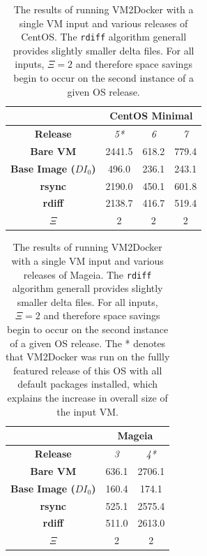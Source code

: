 \begin{table}[h]
\centering
    \begin{tabular}{| c | c | c | c |}
    \hline
& \multicolumn{3}{|c|}{\bfseries CentOS Minimal} \\ \hline
    \bfseries Release & \itshape 5* & \itshape 6 & \itshape 7 \\ \hline
    \bfseries Bare VM & 2441.5 &  618.2 & 779.4\\ \hline
    \bfseries Base Image ($DI_0$) & 496.0 & 236.1 & 243.1\\ \hline
    \bfseries rsync & 2190.0 & 450.1 & 601.8\\ \hline 
    \bfseries rdiff & 2138.7 & 416.7 & 519.4\\ \hline
\bfseries $\Xi$ & 2 & 2 & 2 \\ \hline
    \end{tabular}
\caption{The results of running VM2Docker with a single VM input and various releases of CentOS. The \texttt{rdiff} algorithm generall provides slightly smaller delta files. For all inputs, $\Xi = 2$ and therefore space savings begin to occur on the second instance of a given OS release.}
\label{table:diff2}
\end{table}

\begin{table}[h]
\centering
    \begin{tabular}{| c | c | c |}
    \hline
& \multicolumn{2}{|c|}{\bfseries Mageia} \\ \hline
    \bfseries Release & \itshape 3 & \itshape 4*  \\ \hline
    \bfseries Bare VM & 636.1 & 2706.1 \\ \hline
    \bfseries Base Image ($DI_0$) & 160.4 & 174.1\\ \hline
    \bfseries rsync & 525.1 & 2575.4\\ \hline 
    \bfseries rdiff & 511.0 & 2613.0\\ \hline 
\bfseries $\Xi$ & 2 & 2  \\ \hline
    \end{tabular}
\caption{The results of running VM2Docker with a single VM input and various releases of Mageia. The \texttt{rdiff} algorithm generall provides slightly smaller delta files. For all inputs, $\Xi = 2$ and therefore space savings begin to occur on the second instance of a given OS release. The * denotes that VM2Docker was run on the fullly featured release of this OS with all default packages installed, which explains the increase in overall size of the input VM.}
\label{table:diff3}
\end{table}

